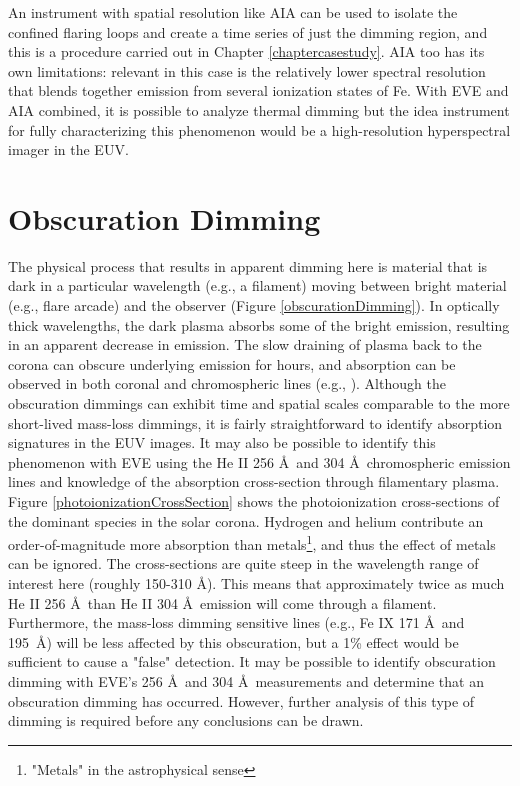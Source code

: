An instrument with spatial resolution like AIA can be used to isolate the confined flaring loops and create a time series of just the dimming region, and this is a procedure carried out in Chapter \ref{chaptercasestudy}. AIA too has its own limitations: relevant in this case is the relatively lower spectral resolution that blends together emission from several ionization states of Fe. With EVE and AIA combined, it is possible to analyze thermal dimming but the idea instrument for fully characterizing this phenomenon would be a high-resolution hyperspectral imager in the EUV.

\section{Obscuration Dimming}
The physical process that results in apparent dimming here is material that is dark in a particular wavelength (e.g., a filament) moving between bright material (e.g., flare arcade) and the observer (Figure \ref{obscurationDimming}). In optically thick wavelengths, the dark plasma absorbs some of the bright emission, resulting in an apparent decrease in emission. The slow draining of plasma back to the corona can obscure underlying emission for hours, and absorption can be observed in both coronal and chromospheric lines (e.g., \citet{Gilbert2013}). Although the obscuration dimmings can exhibit time and spatial scales comparable to the more short-lived mass-loss dimmings, it is fairly straightforward to identify absorption signatures in the EUV images. It may also be possible to identify this phenomenon with EVE using the He II 256 \AA\ and 304 \AA\ chromospheric emission lines and knowledge of the absorption cross-section through filamentary plasma. Figure \ref{photoionizationCrossSection} shows the photoionization cross-sections of the dominant species in the solar corona. Hydrogen and helium contribute an order-of-magnitude more absorption than metals\footnote{"Metals" in the astrophysical sense}, and thus the effect of metals can be ignored. The cross-sections are quite steep in the wavelength range of interest here (roughly 150-310 \AA). This means that approximately twice as much He II 256 \AA\ than He II 304 \AA\ emission will come through a filament. Furthermore, the mass-loss dimming sensitive lines (e.g., Fe IX 171 \AA\ and 195 \AA) will be less affected by this obscuration, but a 1\% effect would be sufficient to cause a "false" detection. It may be possible to identify obscuration dimming with EVE's 256 \AA\ and 304 \AA\ measurements and determine that an obscuration dimming has occurred. However, further analysis of this type of dimming is required before any conclusions can be drawn. 

